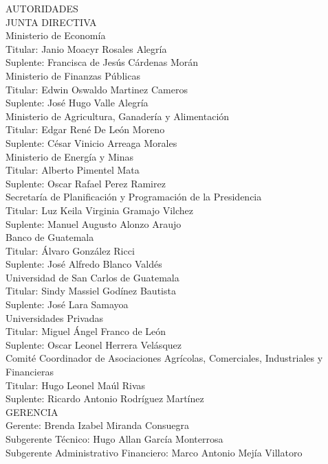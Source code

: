 {\Bold \LARGE AUTORIDADES}\\[1cm]
{\Bold \large \color{color1!89!black} JUNTA  DIRECTIVA} \\[0.4cm]
{\Bold Ministerio de Economía}\\ 
Titular: Janio Moacyr Rosales Alegría \\ 
Suplente: Francisca de Jesús Cárdenas Morán\\[0.4cm]

{\Bold Ministerio de Finanzas Públicas}\\ 
Titular: Edwin Oswaldo Martinez Cameros\\ 
Suplente: José Hugo Valle Alegría\\[0.4cm]

{\Bold Ministerio de Agricultura, Ganadería y Alimentación}\\ 
Titular: Edgar René De León Moreno\\ 
Suplente: César Vinicio Arreaga Morales\\[0.4cm]

{\Bold Ministerio de Energía y Minas}\\ 
Titular: Alberto Pimentel Mata\\ 
Suplente: Oscar Rafael Perez Ramirez\\[0.4cm]

{\Bold Secretaría de Planificación y Programación de la Presidencia}\\ 
Titular: Luz Keila Virginia Gramajo Vilchez\\ 
Suplente: Manuel Augusto Alonzo Araujo\\[0.4cm]

{\Bold Banco de Guatemala}\\ 
Titular: Álvaro González Ricci \\ 
Suplente: José Alfredo Blanco Valdés\\[0.4cm]

{\Bold Universidad de San Carlos de Guatemala}\\ 
Titular: Sindy Massiel Godínez Bautista\\ 
Suplente: José Lara Samayoa\\[0.4cm]

{\Bold Universidades Privadas}\\ 
Titular: Miguel Ángel Franco de León\\ 
Suplente: Oscar Leonel Herrera Velásquez\\[0.4cm]

{\Bold Comité Coordinador de Asociaciones Agrícolas, Comerciales, Industriales y Financieras}\\ 
Titular: Hugo Leonel Maúl Rivas\\ 
Suplente: Ricardo Antonio Rodríguez Martínez\\[0.4cm]

{\Bold \large \color{color1!89!black} GERENCIA}\\[0.2cm]
Gerente: Brenda Izabel Miranda Consuegra\\ 
Subgerente Técnico: Hugo Allan García Monterrosa\\ 
Subgerente Administrativo Financiero: Marco Antonio Mejía Villatoro\\ 
